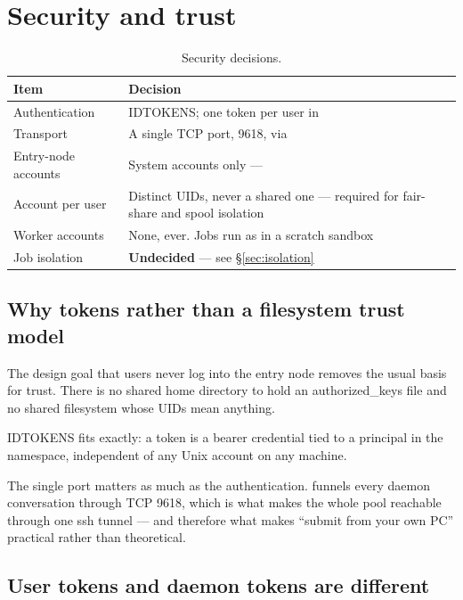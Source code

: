 \chapter{Security and trust}
\label{ch:security}

\begin{table}[H]
\centering
\begin{tabularx}{\textwidth}{L{0.26\textwidth} Y}
\toprule
\textbf{Item} & \textbf{Decision} \\
\midrule
Authentication & IDTOKENS; one token per user in  \\
Transport & A single TCP port, 9618, via  \\
Entry-node accounts & System accounts only ---  \\
Account per user & Distinct UIDs, never a shared one --- required for fair-share and spool isolation \\
Worker accounts & None, ever. Jobs run as  in a scratch sandbox \\
Job isolation & \textbf{Undecided} --- see \S\ref{sec:isolation} \\
\bottomrule
\end{tabularx}
\caption{Security decisions.}
\end{table}

\section{Why tokens rather than a filesystem trust model}

The design goal that users never log into the entry node removes the usual basis
for trust. There is no shared home directory to hold an authorized\_keys file and
no shared filesystem whose UIDs mean anything.

IDTOKENS fits exactly: a token is a bearer credential tied to a principal in the
 namespace, independent of any Unix account on any machine.

\begin{keypoint}
The single port matters as much as the authentication. 
funnels every daemon conversation through TCP 9618, which is what makes the whole
pool reachable through one ssh tunnel --- and therefore what makes ``submit from
your own PC'' practical rather than theoretical.
\end{keypoint}

\section{User tokens and daemon tokens are different}

